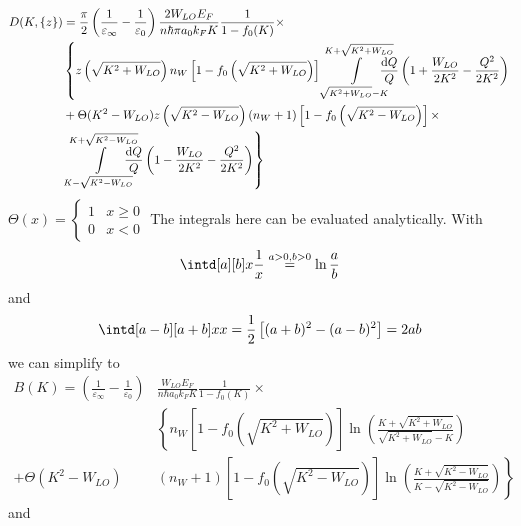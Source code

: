 \documentclass[physics,phd,nolot,nolof]{uccthesis}%
\begin{document}
{%
\begin{equation}
  \begin{split}
D(K,\{z\})
&=\frac{\pi}{2}\left(\frac{1}{\varepsilon_\infty}-\frac{1}{\varepsilon_0}\right)
    \frac{2W_{LO}E_F}{n\hbar \pi a_0k_F K}
\frac{1}{1-f_0(K)}
    \times\\
&  \left\{
z\left(\sqrt{K^2+W_{LO}}\right)
n_W
\left[1-f_0\left(\sqrt{K^2+W_{LO}}\right)\right] 
 \int\limits_{\sqrt{K^2+W_{LO}}-K}^{K+\sqrt{K^2+W_{LO}}}\mkern-20mu\frac{\mathrm{d}Q}{Q}
\left(1+\frac{W_{LO}}{2K^2}-\frac{Q^2}{2K^2}\right)
\right.\\
&
+\Theta(K^2-W_{LO})
z\left(\sqrt{K^2-W_{LO}}\right)
\left(n_W+1\right)
\left[1-f_0\left(\sqrt{K^2-W_{LO}}\right)\right]\times\\ 
&\left.
\int\limits_{K-\sqrt{K^2-W_{LO}}}^{K+\sqrt{K^2-W_{LO}}}\mkern-20mu\frac{\mathrm{d}Q}{Q}
\left(1-\frac{W_{LO}}{2K^2}-\frac{Q^2}{2K^2}\right)
\right\}
\end{split}
  \label{eq:DK-LO}
\end{equation}
$\Theta(x)=\begin{cases}
  	1&	x\geq 0\\
	0&	x<0
	\end{cases}$
The integrals here can be evaluated analytically.
With
$$\intd[a][b]x\frac{1}{x}\stackrel{a>0,b>0}{=}\ln\frac{a}{b}$$
and
$$\intd[a-b][a+b]x x = \frac{1}{2}\left[(a+b)^2-(a-b)^2\right]=2ab$$
we can simplify to
\begin{equation}
  \begin{split}
B(K) =
 \left(\frac{1}{\varepsilon_\infty}-\frac{1}{\varepsilon_0}\right)
&\frac{W_{LO}E_F}{n\hbar a_0k_F K}
\frac{1}{1-f_0(K)}
\times\\ 
&\left\{
n_W
\left[1-f_0\left(\sqrt{K^2+W_{LO}}\right)\right] 
\ln\left(\frac{K+\sqrt{K^2+W_{LO}}}{\sqrt{K^2+W_{LO}}-K}\right)
\right.\\
+\Theta(K^2-W_{LO})
&\left.
\left(n_W+1\right)
\left[1-f_0\left(\sqrt{K^2-W_{LO}}\right)\right] 
\ln\left(\frac{K+\sqrt{K^2-W_{LO}}}{K-\sqrt{K^2-W_{LO}}}\right)
\right\}
\end{split}
  \label{eq:BK-LO-2}
\end{equation}
and
}
\end{document}
